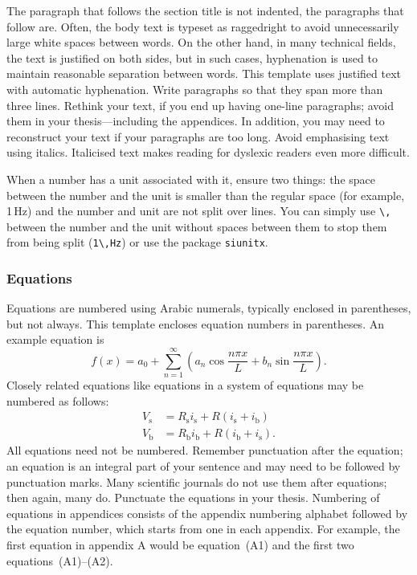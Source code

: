 \documentclass[english, 12pt, a4paper, elec, utf8, a-2b, online]{aaltothesis}
\begin{document}
The paragraph that follows the section title is not indented, the paragraphs 
that follow are. Often, the body text is typeset as raggedright to avoid 
unnecessarily large white spaces between words. On the other hand, in many 
technical fields, the text is justified on both sides, but in such cases, 
hyphenation is used to maintain reasonable separation between words. This 
template uses justified text with automatic hyphenation. Write paragraphs so 
that they span more than three lines. Rethink your text, if you end up having  
one-line paragraphs; avoid them in your thesis---including the appendices. In 
addition, you may need to reconstruct your text if your paragraphs are too long.
Avoid emphasising text using italics. Italicised text makes reading for dyslexic
readers even more difficult.

When a number has a unit associated with it, ensure two things: the space 
between the number and the unit is smaller than the regular space (for example, 
1\,Hz) and the number and unit are not split over lines. You can simply use 
\verb+\,+ between the number and the unit without spaces between them to stop 
them from being split (\verb+1\,Hz+) or use the package \verb+siunitx+.


\subsubsection{Equations}

Equations are numbered using Arabic numerals, typically enclosed in parentheses,
but not always. This template encloses equation numbers in parentheses. An 
example equation is
\begin{equation}
	f(x) = a_0 + \sum_{n=1}^{\infty} \left( a_n \cos\frac{n\pi x}{L} + 
	b_n \sin\frac{n\pi x}{L} \right).
\end{equation}
Closely related equations like equations in a system of equations may be numbered 
as follows:
\begin{subequations}\label{eq:ohm}
  \begin{alignat}{1}
	V_\text{s} &= R_\text{s} i_\text{s} + R(i_\text{s} + i_\text{b})
	 \label{eq:ohm1}\\
	V_\text{b} &= R_\text{b} i_\text{b} + R(i_\text{b} + i_\text{s}).
	 \label{eq:ohm2}
  \end{alignat}
\end{subequations}
All equations need not be numbered. Remember punctuation after the equation; an
equation is an integral part of your sentence and may need to be followed by 
punctuation marks. Many scientific journals do not use them after equations;
then again, many do. Punctuate the equations in your thesis. Numbering of
equations in appendices consists of the appendix numbering alphabet followed by
the equation number, which starts from one in each appendix. For example, the
first equation in appendix A would be equation~(A1) and the first two 
equations~(A1)--(A2).
\end{document}
